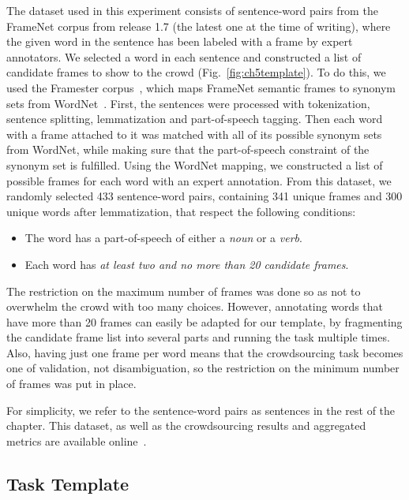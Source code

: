 The dataset used in this experiment consists of sentence-word pairs from the FrameNet corpus from release 1.7 (the latest one at the time of writing), where  the given word in the sentence has been labeled with a frame by expert annotators. We selected a word in each sentence and constructed a list of candidate frames to show to the crowd (Fig.~\ref{fig:ch5template}). To do this, we used the Framester corpus~\cite{gangemi2016framester}, which maps FrameNet semantic frames to synonym sets from WordNet~\cite{miller1995wordnet}. First, the sentences were processed with tokenization, sentence splitting, lemmatization and part-of-speech tagging. Then each word with a frame attached to it was matched with all of its possible synonym sets from WordNet, while making sure that the part-of-speech constraint of the synonym set is fulfilled. Using the WordNet mapping, we constructed a list of possible frames for each word with an expert annotation. From this dataset, we randomly selected 433 sentence-word pairs, containing 341 unique frames and 300 unique words after lemmatization, that respect the following conditions:

\begin{itemize}

\item The word has a part-of-speech of either a \textit{noun} or a \textit{verb}.

\item Each word has \textit{at least two and no more than 20 candidate frames}.

\end{itemize}

The restriction on the maximum number of frames was done so as not to overwhelm the crowd with too many choices. However, annotating words that have more than 20 frames can easily be adapted for our template, by fragmenting the candidate frame list into several parts and running the task multiple times. Also, having just one frame per word means that the crowdsourcing task becomes one of validation, not disambiguation, so the restriction on the minimum number of frames was put in place.

For simplicity, we refer to the sentence-word pairs as sentences in the rest of the chapter. This dataset, as well as the crowdsourcing results and aggregated metrics are available online~\cite{anca_dumitrache_2018_1472345}.

\subsection{Task Template}


